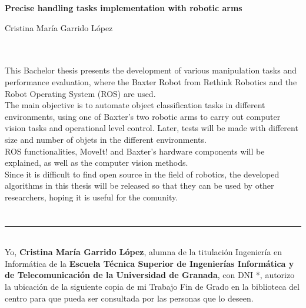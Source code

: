 \thispagestyle{empty}


\begin{center}
{\large\bfseries Precise handling tasks implementation with robotic arms}\\
\end{center}
\begin{center}
Cristina María Garrido López\\
\end{center}

\\

\vspace{0.7cm}
\\

\noindent This Bachelor thesis presents the development of various manipulation tasks and performance evaluation, where the Baxter Robot from Rethink Robotics and the Robot Operating System (ROS) are used. \\

\noindent The main objective is to automate object classification tasks in different environments, using one of Baxter's two robotic arms to carry out computer vision tasks and operational level control. Later, tests will be made with different size and number of objets in the different environments. \\

\noindent ROS functionalities, MoveIt! and Baxter's hardware components will be explained, as well as the computer vision methods. \\

\noindent Since it is difficult to find open source in the field of robotics, the developed algorithms in this thesis will be released so that they can be used by other researchers, hoping it is useful for the comunity. \\

\chapter*{}
\newpage
\thispagestyle{empty}

\noindent\rule[-1ex]{\textwidth}{2pt}\\[4.5ex]

Yo, \textbf{Cristina María Garrido López}, alumna de la titulación Ingeniería en Informática de la \textbf{Escuela Técnica Superior
de Ingenierías Informática y de Telecomunicación de la Universidad de Granada}, con DNI *, autorizo la
ubicación de la siguiente copia de mi Trabajo Fin de Grado en la biblioteca del centro para que pueda ser
consultada por las personas que lo deseen.

